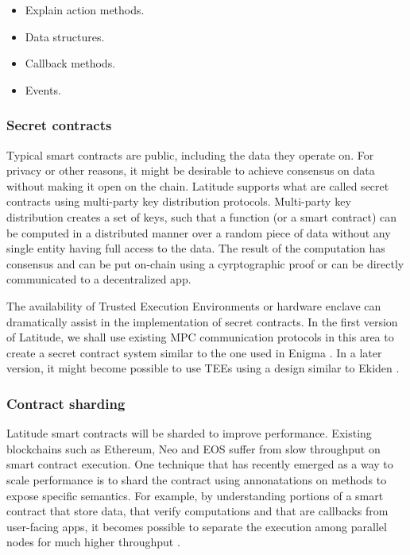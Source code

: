 \begin{itemize}

    \item Explain action methods.
    \item Data structures.
    \item Callback methods.
    \item Events.

\end{itemize}

\subsubsection{Secret contracts}

Typical smart contracts are public, including the data they operate on. For privacy or other reasons, it might be
desirable to achieve consensus on data without making it open on the chain. Latitude supports what are called secret
contracts using multi-party key distribution protocols. Multi-party key distribution creates a set of keys, such that a
function (or a smart contract) can be computed in a distributed manner over a random piece of data without any single
entity having full access to the data. The result of the computation has consensus and can be put on-chain using a
cyrptographic proof or can be directly communicated to a decentralized  app.

The availability of Trusted Execution Environments or hardware enclave can dramatically assist in the implementation of
secret contracts. In the first version of Latitude, we shall use existing MPC communication protocols in this area to
create a secret contract system similar to the one used in Enigma \cite{enigma}. In a later version, it might become
possible to use TEEs using a design similar to Ekiden \cite{ekiden}.



\subsubsection{Contract sharding}

Latitude smart contracts will be sharded to improve performance. Existing blockchains such as Ethereum, Neo and EOS
suffer from slow throughput on smart contract execution. One technique that has recently emerged as a way to scale
performance is to shard the contract using annonatations on methods to expose specific semantics. For example, by
understanding portions of a smart contract that store data, that verify computations and that are callbacks from
user-facing apps, it becomes possible to separate the execution among parallel nodes for much higher throughput
\cite{chainspace}. 

